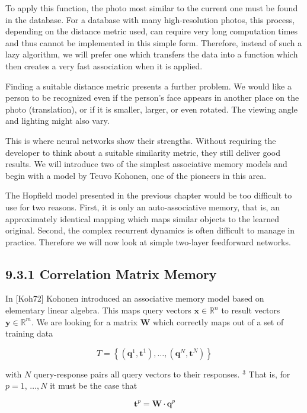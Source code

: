 \documentclass[10pt]{article}
\begin{document}
To apply this function, the photo most similar to the current one must be found in the database. For a database with many high-resolution photos, this process, depending on the distance metric used, can require very long computation times and thus cannot be implemented in this simple form. Therefore, instead of such a lazy algorithm, we will prefer one which transfers the data into a function which then creates a very fast association when it is applied.


Finding a suitable distance metric presents a further problem. We would like a person to be recognized even if the person's face appears in another place on the photo (translation), or if it is smaller, larger, or even rotated. The viewing angle and lighting might also vary.

This is where neural networks show their strengths. Without requiring the developer to think about a suitable similarity metric, they still deliver good results. We will introduce two of the simplest associative memory models and begin with a model by Teuvo Kohonen, one of the pioneers in this area.

The Hopfield model presented in the previous chapter would be too difficult to use for two reasons. First, it is only an auto-associative memory, that is, an approximately identical mapping which maps similar objects to the learned original. Second, the complex recurrent dynamics is often difficult to manage in practice. Therefore we will now look at simple two-layer feedforward networks.

\subsection*{9.3.1 Correlation Matrix Memory}
In [Koh72] Kohonen introduced an associative memory model based on elementary linear algebra. This maps query vectors $\boldsymbol{x} \in \mathbb{R}^{n}$ to result vectors $\boldsymbol{y} \in \mathbb{R}^{m}$. We are looking for a matrix $\boldsymbol{W}$ which correctly maps out of a set of training data

$$
T=\left\{\left(\boldsymbol{q}^{1}, \boldsymbol{t}^{1}\right), \ldots,\left(\boldsymbol{q}^{N}, \boldsymbol{t}^{N}\right)\right\}
$$

with $N$ query-response pairs all query vectors to their responses. ${ }^{3}$ That is, for $p=1$, $\ldots, N$ it must be the case that


\begin{equation*}
\boldsymbol{t}^{p}=\boldsymbol{W} \cdot \boldsymbol{q}^{p} \tag{9.3}
\end{equation*}
\end{document}
